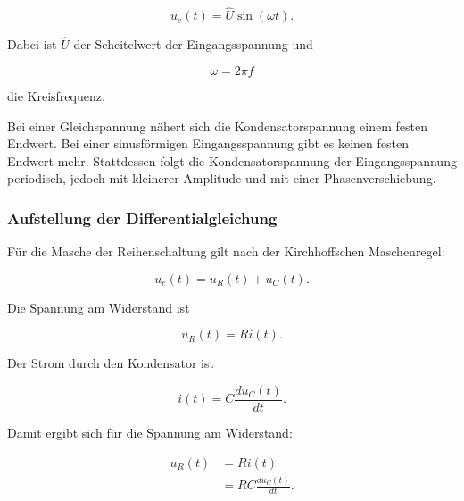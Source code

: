 \begin{equation}
	u_e(t) = \hat{U} \sin(\omega t).
	\label{eq:rc-eingangsspannung-sinus}
\end{equation}

Dabei ist \(\hat{U}\) der Scheitelwert der Eingangsspannung und

\begin{equation}
	\omega = 2\pi f
	\label{eq:rc-kreisfrequenz}
\end{equation}

die Kreisfrequenz.

\begin{PhysicsBox}
	\label{box:rc-sinus-physikalische-situation}
	Bei einer Gleichspannung nähert sich die Kondensatorspannung einem festen
	Endwert. Bei einer sinusförmigen Eingangsspannung gibt es keinen festen
	Endwert mehr. Stattdessen folgt die Kondensatorspannung der Eingangsspannung
	periodisch, jedoch mit kleinerer Amplitude und mit einer Phasenverschiebung.
\end{PhysicsBox}

\subsubsection{Aufstellung der Differentialgleichung}
\label{subsubsec:rc-sinus-differentialgleichung}

Für die Masche der Reihenschaltung gilt nach der Kirchhoffschen Maschenregel:

\begin{equation}
	u_e(t) = u_R(t) + u_C(t).
	\label{eq:rc-maschensatz}
\end{equation}

Die Spannung am Widerstand ist

\begin{equation}
	u_R(t) = R i(t).
	\label{eq:rc-widerstandsspannung}
\end{equation}

Der Strom durch den Kondensator ist

\begin{equation}
	i(t) = C \frac{du_C(t)}{dt}.
	\label{eq:rc-kondensatorstrom}
\end{equation}

Damit ergibt sich für die Spannung am Widerstand:

\begin{align}
	u_R(t)
	&= R i(t) \\[4pt]
	&= R C \frac{du_C(t)}{dt}.
	\label{eq:rc-widerstandsspannung-mit-kondensatorstrom}
\end{align}

